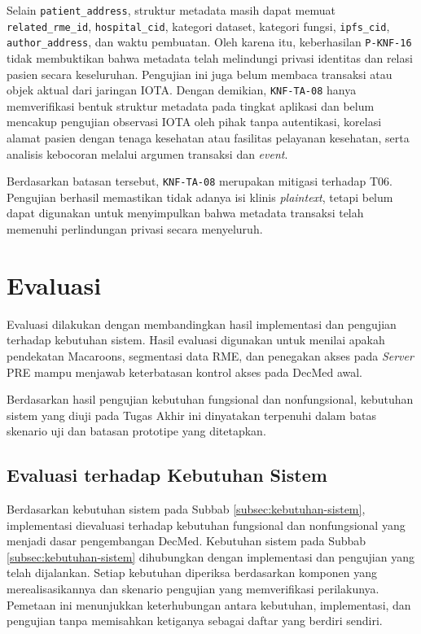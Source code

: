\documentclass[bahasa, 12pt, a4paper, onecolumn, oneside, final]{report}
\begin{document}
Selain \texttt{patient\_address}, struktur metadata masih dapat memuat \texttt{related\_rme\_id}, \texttt{hospital\_cid}, kategori dataset, kategori fungsi, \texttt{ipfs\_cid}, \texttt{author\_address}, dan waktu pembuatan. Oleh karena itu, keberhasilan \texttt{P-KNF-16} tidak membuktikan bahwa metadata telah melindungi privasi identitas dan relasi pasien secara keseluruhan. Pengujian ini juga belum membaca transaksi atau objek aktual dari jaringan IOTA. Dengan demikian, \texttt{KNF-TA-08} hanya memverifikasi bentuk struktur metadata pada tingkat aplikasi dan belum mencakup pengujian observasi IOTA oleh pihak tanpa autentikasi, korelasi alamat pasien dengan tenaga kesehatan atau fasilitas pelayanan kesehatan, serta analisis kebocoran melalui argumen transaksi dan \textit{event}.

Berdasarkan batasan tersebut, \texttt{KNF-TA-08} merupakan mitigasi terhadap T06. Pengujian berhasil memastikan tidak adanya isi klinis \textit{plaintext}, tetapi belum dapat digunakan untuk menyimpulkan bahwa metadata transaksi telah memenuhi perlindungan privasi secara menyeluruh.  \section{Evaluasi}
\label{sec:evaluasi}

Evaluasi dilakukan dengan membandingkan hasil implementasi dan pengujian terhadap kebutuhan sistem. Hasil evaluasi digunakan untuk menilai apakah pendekatan Macaroons, segmentasi data RME, dan penegakan akses pada \textit{Server} PRE mampu menjawab keterbatasan kontrol akses pada DecMed awal.

Berdasarkan hasil pengujian kebutuhan fungsional dan nonfungsional, kebutuhan sistem yang diuji pada Tugas Akhir ini dinyatakan terpenuhi dalam batas skenario uji dan batasan prototipe yang ditetapkan.

\subsection{Evaluasi terhadap Kebutuhan Sistem}
\label{subsec:evaluasi-kebutuhan-sistem}

Berdasarkan kebutuhan sistem pada Subbab \ref{subsec:kebutuhan-sistem}, implementasi dievaluasi terhadap kebutuhan fungsional dan nonfungsional yang menjadi dasar pengembangan DecMed. Kebutuhan sistem pada Subbab \ref{subsec:kebutuhan-sistem} dihubungkan dengan implementasi dan pengujian yang telah dijalankan. Setiap kebutuhan diperiksa berdasarkan komponen yang merealisasikannya dan skenario pengujian yang memverifikasi perilakunya. Pemetaan ini menunjukkan keterhubungan antara kebutuhan, implementasi, dan pengujian tanpa memisahkan ketiganya sebagai daftar yang berdiri sendiri.
\end{document}
